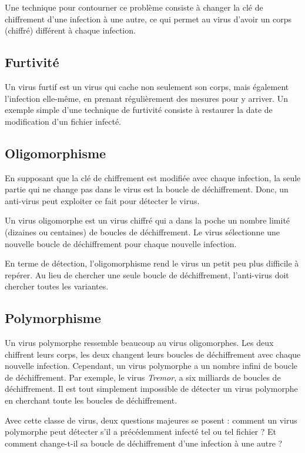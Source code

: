     Une technique pour contourner ce problème consiste à changer la clé de chiffrement d'une infection à une autre, ce
    qui permet au virus d'avoir un corps (chiffré) différent à chaque infection. \cite{virus} %

    \subsection{Furtivité}
    Un virus furtif est un virus qui cache non seulement son corps, mais également l'infection elle-même,
    en prenant régulièrement des mesures pour y arriver. 
    Un exemple simple d'une technique de furtivité consiste à restaurer la date de modification d'un fichier infecté.

    \subsection{Oligomorphisme}
    En supposant que la clé de chiffrement est modifiée avec chaque infection, la seule partie qui ne change pas
    dans le virus est la boucle de déchiffrement. Donc, un anti-virus peut exploiter ce fait pour détecter le virus. 
    \cite{virus} %

    Un virus oligomorphe est un virus chiffré qui a dans la poche un nombre limité (dizaines ou centaines) 
    de boucles de déchiffrement. Le virus sélectionne une nouvelle boucle de déchiffrement 
    pour chaque nouvelle infection. \cite{virus} %

    En terme de détection, l'oligomorphisme rend le virus un petit peu plus difficile à repérer. Au lieu de chercher
    une seule boucle de déchiffrement, l'anti-virus doit chercher toutes les variantes. \cite{virus} %

    \subsection{Polymorphisme}
    Un virus polymorphe ressemble beaucoup au virus oligomorphes. Les deux chiffrent leurs corps, les deux changent leurs
    boucles de déchiffrement avec chaque nouvelle infection. Cependant, un virus polymorphe a un nombre infini de 
    boucle de déchiffrement. Par exemple, le virus \emph{Tremor}, a six milliards de boucles de déchiffrement. Il est
    tout simplement impossible de détecter un virus polymorphe en cherchant toute les boucles de déchiffrement. 
    \cite{virus} %

    Avec cette classe de virus, deux questions majeures se posent : comment un virus polymorphe peut détecter
    s'il a précédemment infecté tel ou tel fichier ? Et comment change-t-il sa boucle de déchiffrement d'une infection
    à une autre ? \cite{virus} %
